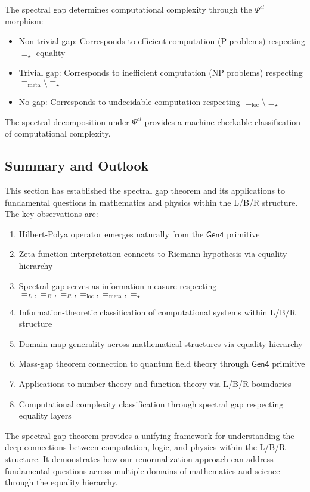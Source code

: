 \begin{theorem}
\label{thm:spectral-complexity-lbr}
The spectral gap determines computational complexity through the $\Psi^{cl}$ morphism:
\begin{itemize}
\item Non-trivial gap: Corresponds to efficient computation (P problems) respecting $\equiv_\star$ equality
\item Trivial gap: Corresponds to inefficient computation (NP problems) respecting $\equiv_{\text{meta}} \setminus \equiv_\star$
\item No gap: Corresponds to undecidable computation respecting $\equiv_{\text{loc}} \setminus \equiv_\star$
\end{itemize}
The spectral decomposition under $\Psi^{cl}$ provides a machine-checkable classification of computational complexity.
\end{theorem}

\subsection{Summary and Outlook}

This section has established the spectral gap theorem and its applications to fundamental questions in mathematics and physics within the L/B/R structure. The key observations are:

\begin{enumerate}
\item Hilbert-Polya operator emerges naturally from the $\mathsf{Gen4}$ primitive
\item Zeta-function interpretation connects to Riemann hypothesis via equality hierarchy
\item Spectral gap serves as information measure respecting $\equiv_L, \equiv_B, \equiv_R, \equiv_{\text{loc}}, \equiv_{\text{meta}}, \equiv_\star$
\item Information-theoretic classification of computational systems within L/B/R structure
\item Domain map generality across mathematical structures via equality hierarchy
\item Mass-gap theorem connection to quantum field theory through $\mathsf{Gen4}$ primitive
\item Applications to number theory and function theory via L/B/R boundaries
\item Computational complexity classification through spectral gap respecting equality layers
\end{enumerate}

The spectral gap theorem provides a unifying framework for understanding the deep connections between computation, logic, and physics within the L/B/R structure. It demonstrates how our renormalization approach can address fundamental questions across multiple domains of mathematics and science through the equality hierarchy.
